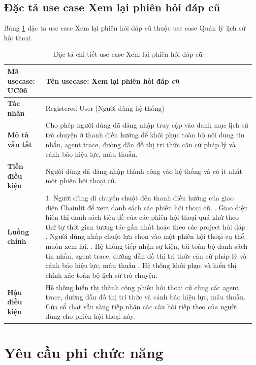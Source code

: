 \documentclass[../DoAn.tex]{subfiles}
\begin{document}
\subsection{Đặc tả use case Xem lại phiên hỏi đáp cũ}
Bảng \ref{table:uc_specs_resume} đặc tả use case Xem lại phiên hỏi đáp cũ thuộc use case Quản lý lịch sử hội thoại.
\begin{table}[H]
\centering
\begin{tabular}{|p{3.5cm}|p{11.5cm}|}
\hline
\textbf{Mã usecase:} UC06 & \textbf{Tên usecase:} Xem lại phiên hỏi đáp cũ \\ \hline
\textbf{Tác nhân} & Registered User (Người dùng hệ thống) \\ \hline
\textbf{Mô tả vắn tắt} & Cho phép người dùng đã đăng nhập truy cập vào danh mục lịch sử trò chuyện ở thanh điều hướng để khôi phục toàn bộ nội dung tin nhắn, agent trace, đường dẫn đồ thị tri thức căn cứ pháp lý và cảnh báo hiệu lực, mâu thuẫn. \\ \hline
\textbf{Tiền điều kiện} & Người dùng đã đăng nhập thành công vào hệ thống và có ít nhất một phiên hội thoại cũ. \\ \hline
\textbf{Luồng chính} &
1. Người dùng di chuyển chuột đến thanh điều hướng của giao diện Chainlit để xem danh sách các phiên hội thoại cũ. \newline
2. Giao diện hiển thị danh sách tiêu đề của các phiên hội thoại quá khứ theo thứ tự thời gian tương tác gần nhất hoặc theo các project hỏi đáp \newline
3. Người dùng nhấp chuột lựa chọn vào một phiên hội thoại cụ thể muốn xem lại. \newline
4. Hệ thống tiếp nhận sự kiện, tải toàn bộ danh sách tin nhắn, agent trace, đường dẫn đồ thị tri thức căn cứ pháp lý và cảnh báo hiệu lực, mâu thuẫn \newline
5. Hệ thống khôi phục và hiển thị chính xác toàn bộ lịch sử trò chuyện. \\ \hline
\textbf{Hậu điều kiện} & Hệ thống hiển thị thành công phiên hội thoại cũ cùng các agent trace, đường dẫn đồ thị tri thức và cảnh báo hiệu lực, mâu thuẫn. Cửa sổ chat sẵn sàng tiếp nhận các câu hỏi tiếp theo của người dùng cho phiên hội thoại này. \\ \hline
\end{tabular}
\caption{Đặc tả chi tiết use case Xem lại phiên hỏi đáp cũ}
\label{table:uc_specs_resume}
\end{table}
\section{Yêu cầu phi chức năng}
\label{section:2.4}
\end{document}
